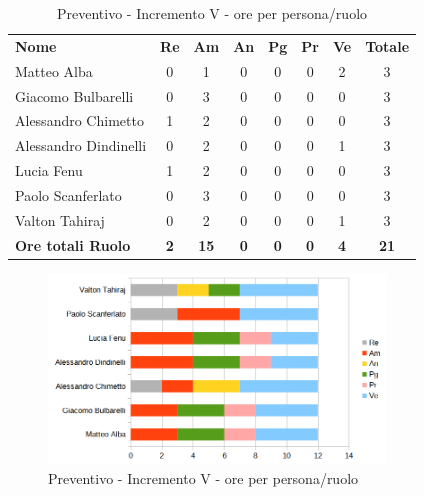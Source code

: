 \begin{table} [h!]
	\begin{center}
		\begin{tabular} { m{3.5cm} c c c c c c c }
			\rowcolor{lightgray}
			\textbf{Nome} & \textbf{Re} & \textbf{Am} & \textbf{An} & \textbf{Pg} & \textbf{Pr} & \textbf{Ve} & \textbf{Totale} \\
			Matteo Alba & 0 & 1 & 0 & 0 & 0 & 2 & 3 \\
			Giacomo Bulbarelli & 0 & 3 & 0 & 0 & 0 & 0 & 3 \\
			Alessandro Chimetto & 1 & 2 & 0 & 0 & 0 & 0 & 3 \\
			Alessandro Dindinelli & 0 & 2 & 0 & 0 & 0 & 1 & 3 \\
			Lucia Fenu & 1 & 2 & 0 & 0 & 0 & 0 & 3 \\
			Paolo Scanferlato & 0 & 3 & 0 & 0 & 0 & 0 & 3 \\
			Valton Tahiraj & 0 & 2 & 0 & 0 & 0 & 1 & 3 \\
			\textbf{Ore totali Ruolo} & \textbf{2} & \textbf{15} & \textbf{0} & \textbf{0} & \textbf{0}& \textbf{4} & \textbf{21}
		\end{tabular}
		\caption{Preventivo - Incremento V - ore per persona/ruolo}
	\end{center}
\end{table}
\begin{figure} [h!]
	\centering
	\includegraphics[width=0.8\textwidth]{res/img/preventivi/8e9-barre.png}
	\caption{Preventivo - Incremento V - ore per persona/ruolo} 
\end{figure}

\newpage
